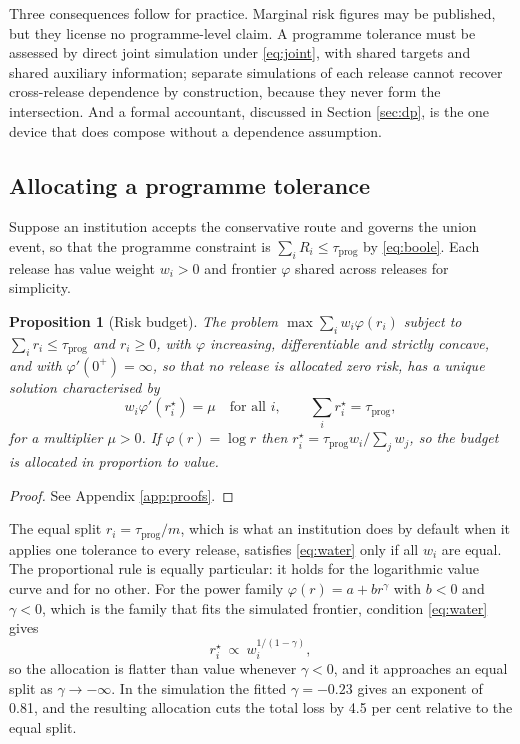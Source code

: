 \documentclass[11pt,a4paper]{article}
\theoremstyle{plain}
\newtheorem{proposition}{Proposition}
\theoremstyle{definition}
\begin{document}
Three consequences follow for practice. Marginal risk figures may be published,
but they license no programme-level claim. A programme tolerance must be
assessed by direct joint simulation under \eqref{eq:joint}, with shared targets
and shared auxiliary information; separate simulations of each release cannot
recover cross-release dependence by construction, because they never form the
intersection. And a formal accountant, discussed in Section \ref{sec:dp}, is
the one device that does compose without a dependence assumption.

\subsection{Allocating a programme tolerance}

Suppose an institution accepts the conservative route and governs the union
event, so that the programme constraint is $\sum_i R_i \leq \tau_{\mathrm{prog}}$
by \eqref{eq:boole}. Each release has value weight $w_i > 0$ and frontier
$\varphi$ shared across releases for simplicity.

\begin{proposition}[Risk budget]\label{prop:budget}
The problem $\max \sum_i w_i \varphi(r_i)$ subject to $\sum_i r_i \leq
\tau_{\mathrm{prog}}$ and $r_i \geq 0$, with $\varphi$ increasing,
differentiable and strictly concave, and with $\varphi'(0^+) = \infty$, so that no release is
allocated zero risk, has a unique solution characterised by
\begin{equation}
w_i \varphi'(r_i^\star) = \mu \quad \text{for all } i, \qquad
\sum_i r_i^\star = \tau_{\mathrm{prog}} ,
\label{eq:water}
\end{equation}
for a multiplier $\mu > 0$. If $\varphi(r) = \log r$ then $r_i^\star =
\tau_{\mathrm{prog}} w_i / \sum_j w_j$, so the budget is allocated in
proportion to value.
\end{proposition}

\begin{proof}
See Appendix \ref{app:proofs}.
\end{proof}

The equal split $r_i = \tau_{\mathrm{prog}}/m$, which is what an institution
does by default when it applies one tolerance to every release, satisfies
\eqref{eq:water} only if all $w_i$ are equal. The proportional rule is equally
particular: it holds for the logarithmic value curve and for no other. For the
power family $\varphi(r) = a + b r^{\gamma}$ with $b < 0$ and $\gamma < 0$,
which is the family that fits the simulated frontier, condition
\eqref{eq:water} gives
\begin{equation}
r_i^\star \ \propto \ w_i^{1/(1-\gamma)} ,
\label{eq:power}
\end{equation}
so the allocation is flatter than value whenever $\gamma < 0$, and it
approaches an equal split as $\gamma \to -\infty$. In the simulation the fitted $\gamma = -0.23$ gives an exponent of 0.81, and
the resulting allocation cuts the total loss by 4.5 per cent relative to the
equal split.
\end{document}
